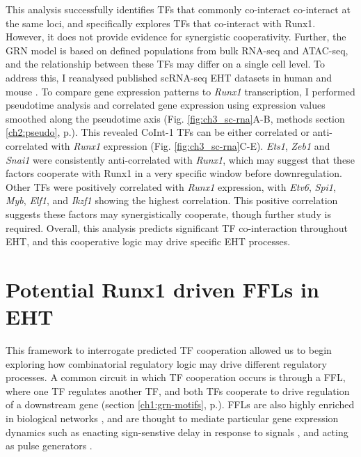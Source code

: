 This analysis successfully identifies TFs that commonly co-interact co-interact at the same loci, and specifically explores TFs that co-interact with Runx1. However, it does not provide evidence for synergistic cooperativity. Further, the GRN model is based on defined populations from bulk RNA-seq and ATAC-seq, and the relationship between these TFs may differ on a single cell level. To address this, I reanalysed published scRNA-seq EHT datasets in human and mouse \citep{zeng_tracing_2019, zhu_developmental_2020}. To compare gene expression patterns to \textit{Runx1} transcription, I performed pseudotime analysis and correlated gene expression using expression values smoothed along the pseudotime axis (Fig. \ref{fig:ch3_sc-rna}A-B, methods section \ref{ch2:pseudo}, p.\pageref{ch2:pseudo}). This revealed CoInt-1 TFs can be either correlated or anti-correlated with \textit{Runx1} expression (Fig. \ref{fig:ch3_sc-rna}C-E). \textit{Ets1}, \textit{Zeb1} and \textit{Snai1} were consistently anti-correlated with \textit{Runx1}, which may suggest that these factors cooperate with Runx1 in a very specific window before downregulation. Other TFs were positively correlated with \textit{Runx1} expression, with \textit{Etv6}, \textit{Spi1}, \textit{Myb}, \textit{Elf1}, and \textit{Ikzf1} showing the highest correlation. This positive correlation suggests these factors may synergistically cooperate, though further study is required. Overall, this analysis predicts significant TF co-interaction throughout EHT, and this cooperative logic may drive specific EHT processes.

\section{Potential Runx1 driven FFLs in EHT}

This framework to interrogate predicted TF cooperation allowed us to begin exploring how combinatorial regulatory logic may drive different regulatory processes. A common circuit in which TF cooperation occurs is through a FFL, where one TF regulates another TF, and both TFs cooperate to drive regulation of a downstream gene (section \ref{ch1:grn-motifs}, p.\pageref{ch1:grn-motifs}). FFLs are also highly enriched in biological networks \citep{milo_network_2002, mangan_structure_2003}, and are thought to mediate particular gene expression dynamics such as enacting sign-senstive delay in response to signals \citep{mangan_coherent_2003, kalir_coherent_2005}, and acting as pulse generators \citep{mangan_structure_2003, basu_spatiotemporal_2004}. 

